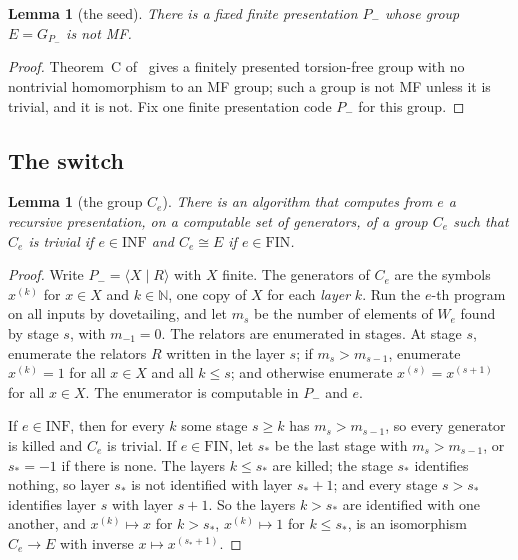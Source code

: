 \documentclass[11pt]{amsart}
\newcommand{\leanverified}[2]{\ignorespaces}
\newtheorem{lemma}[theorem]{Lemma}
\theoremstyle{remark}
\theoremstyle{plain}
\begin{document}
\begin{lemma}[the seed]\label{lem:seed}
There is a fixed finite presentation $P_-$ whose group $E=G_{P_-}$ is not MF.
\end{lemma}

\begin{proof}
Theorem~C of~\cite{NonMF} gives a finitely presented torsion-free group
with no nontrivial homomorphism to an MF group; such a group is not MF
unless it is trivial, and it is not.  Fix one finite presentation code
$P_-$ for this group.
\end{proof}
\leanverified{Computability/PresentationCodeCompleteness}{GroupApproximation.PresentationCodes.not_isOperatorMF_negativeCode}

\subsection*{The switch}

\begin{lemma}[the group $C_e$]\label{lem:switch}
There is an algorithm that computes from $e$ a recursive presentation, on
a computable set of generators, of a group $C_e$ such that $C_e$ is
trivial if $e\in\mathrm{INF}$ and $C_e\cong E$ if
$e\in\mathrm{FIN}$.
\end{lemma}

\begin{proof}
Write $P_-=\langle X\mid R\rangle$ with $X$ finite.  The generators of $C_e$
are the symbols $x^{(k)}$ for $x\in X$ and $k\in\mathbb N$, one copy of $X$
for each \emph{layer} $k$.  Run the $e$-th program on all inputs by
dovetailing, and let $m_s$ be the number of elements of $W_e$ found by
stage $s$, with $m_{-1}=0$.  The relators are enumerated in stages.  At
stage $s$, enumerate the relators $R$ written in the layer $s$; if
$m_s>m_{s-1}$, enumerate $x^{(k)}=1$ for all $x\in X$ and all $k\le s$; and
otherwise enumerate $x^{(s)}=x^{(s+1)}$ for all $x\in X$.  The enumerator
is computable in $P_-$ and $e$.

If $e\in\mathrm{INF}$, then for every $k$ some stage $s\ge k$ has
$m_s>m_{s-1}$, so every generator is killed and $C_e$ is trivial.  If
$e\in\mathrm{FIN}$, let $s_*$ be the last stage with $m_s>m_{s-1}$, or
$s_*=-1$ if there is none.  The layers $k\le s_*$ are killed; the stage
$s_*$ identifies nothing, so layer $s_*$ is not identified with layer
$s_*+1$; and every stage $s>s_*$ identifies layer $s$ with layer $s+1$.  So
the layers $k>s_*$ are identified with one another, and $x^{(k)}\mapsto x$
for $k>s_*$, $x^{(k)}\mapsto1$ for $k\le s_*$, is an isomorphism
$C_e\to E$ with inverse $x\mapsto x^{(s_*+1)}$.
\end{proof}
\leanverified{Computability/ParametricRecursiveSwitchPresentation}{GroupApproximation.ParametricRecursiveSwitchPresentation.computable₂_parametricSwitchEnumeratorCode}
\leanverified{Computability/ParametricRecursiveSwitchPresentation}{GroupApproximation.ParametricRecursiveSwitchPresentation.compiledCarrier_equiv_punit_of_infiniteDomain}
\leanverified{Computability/ParametricRecursiveSwitchPresentation}{GroupApproximation.ParametricRecursiveSwitchPresentation.compiledCarrier_equiv_seed_of_finiteDomain}
\end{document}
